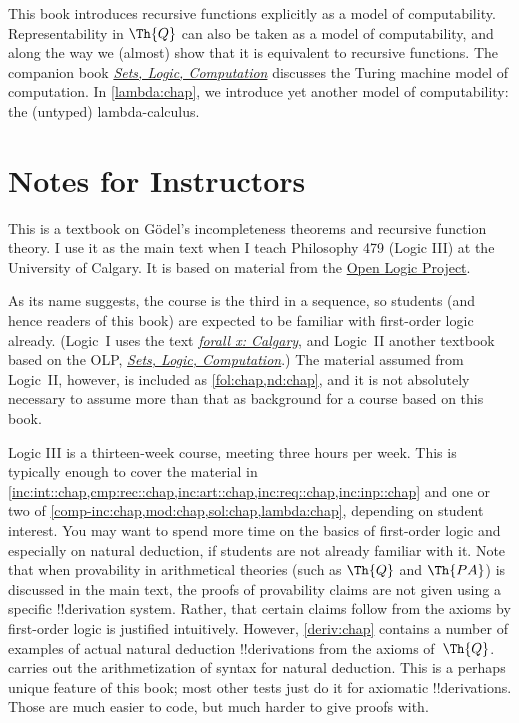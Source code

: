 This book introduces recursive functions explicitly as a model of
computability. Representability in $\Th{Q}$ can also be taken as a
model of computability, and along the way we (almost) show that it is
equivalent to recursive functions. The companion book
\href{https://slc.openlogicproject.org/}{\emph{Sets, Logic, Computation}}
discusses the Turing machine model of computation. In
\cref{lambda:chap}, we introduce yet another model of computability:
the (untyped) lambda-calculus.

\section*{Notes for Instructors}

This is a textbook on G\"odel's incompleteness theorems and recursive
function theory. I use it as the main text when I teach Philosophy 479
(Logic III) at the University of Calgary. It is based on material from the
\href{https://openlogicproject.org}{Open Logic Project}.

As its name suggests, the course is the third in a sequence, so
students (and hence readers of this book) are expected to be familiar
with first-order logic already. (Logic~I uses the text
\href{https://forallx.openlogicproject.org}{\emph{forall x: Calgary}},
and Logic~II another textbook based on the OLP,
\href{https://slc.openlogicproject.org}{\emph{Sets, Logic,
Computation}}.) The material assumed from Logic~II, however, is
included as \cref{fol:chap,nd:chap}, and it is not absolutely
necessary to assume more than that as background for a course based on
this book.

Logic III is a thirteen-week course, meeting three hours per week.
This is typically enough to cover the material in
\cref{inc:int::chap,cmp:rec::chap,inc:art::chap,inc:req::chap,inc:inp::chap}
and one or two of \cref{comp-inc:chap,mod:chap,sol:chap,lambda:chap},
depending on student interest. You may want to spend more time on the
basics of first-order logic and especially on natural deduction, if
students are not already familiar with it. Note that when provability
in arithmetical theories (such as $\Th{Q}$ and $\Th{PA}$) is discussed
in the main text, the proofs of provability claims are not given using
a specific !!{derivation} system. Rather, that certain claims follow
from the axioms by first-order logic is justified intuitively.
However, \cref{deriv:chap} contains a number of examples of actual
natural deduction !!{derivation}s from the axioms of~$\Th{Q}$.
 carries out the arithmetization of syntax for
natural deduction. This is a perhaps unique feature of this book; most
other tests just do it for axiomatic !!{derivation}s. Those are much
easier to code, but much harder to give proofs with.

